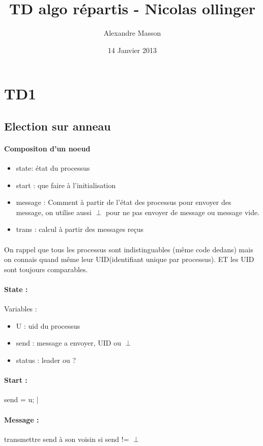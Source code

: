 \documentclass{article}
\title{TD algo répartis - Nicolas ollinger}
\author{Alexandre Masson}
\date{14 Janvier 2013}
\begin{document}
\maketitle
\newpage
\tableofcontents
\newpage
\section{TD1}
\subsection{Election sur anneau}
\paragraph{Compositon d'un noeud}
\begin{itemize}
\item state: état du processus
\item start : que faire à l'initialisation
\item message : Comment à partir de l'état des processus pour envoyer des message, on utilise aussi  $\perp$ pour ne pas envoyer de message ou message vide.
\item trans : calcul à partir des messages reçus
\end{itemize}
\paragraph{} On rappel que tous les processus sont indistinguables (même code dedans) mais on connais quand même leur UID(identifiant  unique par processus). ET les UID sont toujours comparables.
\paragraph{State : }Variables : 
\begin{itemize}
\item U : uid du processus
\item send : message a envoyer, UID ou $\perp$
\item status  : {leader ou ?}
\end{itemize}
\paragraph{Start : } send = u;
|\paragraph{Message : } transmettre send à son voisin si send != $\perp$
\end{document}
